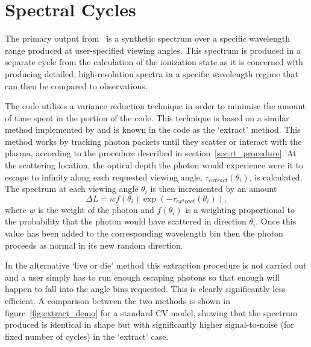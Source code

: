 \section{Spectral Cycles}
\label{sec:spectral_cycles}
The primary output from \py\ is a synthetic spectrum over a specific wavelength
range produced at user-specified viewing angles. This spectrum is produced 
in a separate cycle from the calculation of the ionization state as it is concerned
with producing detailed, high-resolution spectra in a specific wavelength regime
that can then be compared to observations.

The code utilises a variance reduction technique in order to minimise the amount of 
time spent in the portion of the code. This technique is based 
on a similar method implemented by \citep{woods1991} and is known in the code
as the `extract' method. This method works by 
tracking photon packets until they scatter or interact with the plasma, according
to the procedure described in section~\ref{sec:rt_procedure}. 
At the scattering location, the optical depth the photon would
experience were it to escape to infinity along each requested viewing angle, 
$\tau_{extract}(\theta_i)$, is calculated. The spectrum at each 
viewing angle $\theta_i$ is then incremented by an amount
\begin{equation}
\Delta L = w f(\theta_i) \exp(-\tau_{extract}(\theta_i)),
\end{equation}
where $w$ is the weight of the photon and $f(\theta_i)$ is a weighting proportional to
the probability that the photon would have scattered in direction $\theta_i$. Once this
value has been added to the corresponding wavelength bin then the photon
proceeds as normal in its new random direction.

In the alternative `live or die' method this extraction procedure is not
carried out and a user simply has to run enough escaping photons so that enough will happen
to fall into the angle bins requested. This is clearly significantly
less efficient. A comparison between the two methods is shown in 
figure~\ref{fig:extract_demo} for a standard CV model, showing that the spectrum 
produced is identical in shape but with significantly higher signal-to-noise (for
fixed number of cycles) in the `extract' case.

